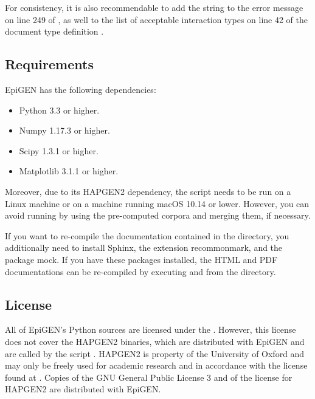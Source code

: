 \documentclass[a4paper,10pt,english]{sphinxhowto}
\begin{document}
For consistency, it is also recommendable to add the string  to the error message on line 249 of , as well to the list of acceptable interaction types on line 42 of the document type definition .


\subsection{Requirements}
\label{\detokenize{README:requirements}}
EpiGEN has the following dependencies:
\begin{itemize}
\item {} 
Python 3.3 or higher.

\item {} 
Numpy 1.17.3 or higher.

\item {} 
Scipy 1.3.1 or higher.

\item {} 
Matplotlib 3.1.1 or higher.

\end{itemize}

Moreover, due to its HAPGEN2 dependency, the script  needs to be run on a Linux machine or on a machine running macOS 10.14 or lower. However, you can avoid running  by using the pre-computed corpora and merging them, if necessary.

If you want to re-compile the documentation contained in the  directory, you additionally need to install Sphinx, the extension recommonmark, and the package mock. If you have these packages installed, the HTML and PDF documentations can be re-compiled by executing  and  from the  directory.


\subsection{License}
\label{\detokenize{README:license}}
All of EpiGEN’s Python sources are licensed under the . However, this license does not cover the HAPGEN2 binaries, which are distributed with EpiGEN and are called by the script . HAPGEN2 is property of the University of Oxford and may only be freely used for academic research and in accordance with the license found at . Copies of the GNU General Public License 3 and of the license for HAPGEN2 are distributed with EpiGEN.
\end{document}
